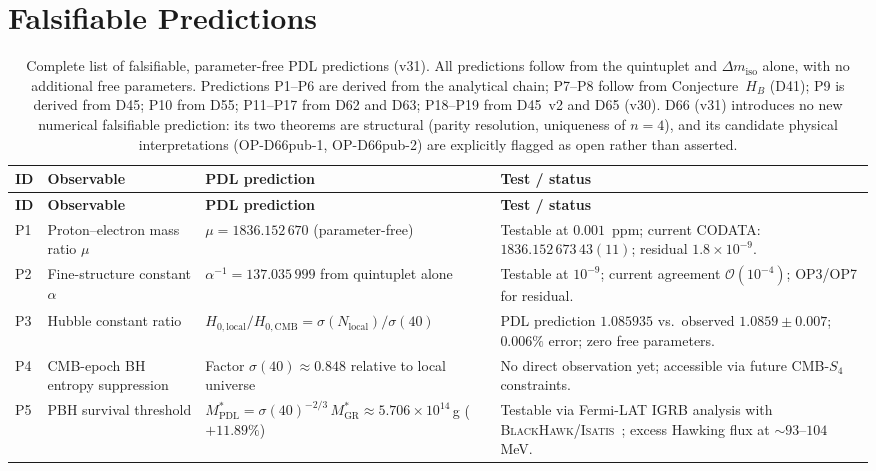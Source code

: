 \documentclass[11pt,a4paper]{article}
\theoremstyle{plain}
\theoremstyle{definition}
\theoremstyle{remark}
\begin{document}
\newpage

\section{Falsifiable Predictions}
\label{sec:predictions}

\begin{longtable}{L{0.5cm}L{3.2cm}L{5.2cm}L{4.2cm}}
\caption{Complete list of falsifiable, parameter-free PDL predictions (v31). All predictions follow from the quintuplet and $\Delta m_{\mathrm{iso}}$ alone, with no additional free parameters. Predictions P1--P6 are derived from the analytical chain; P7--P8 follow from Conjecture~$H_B$ (D41); P9 is derived from D45; P10 from D55; P11--P17 from D62 and D63; P18--P19 from D45~v2 and D65 (v30). D66 (v31) introduces no new numerical falsifiable prediction: its two theorems are structural (parity resolution, uniqueness of $n=4$), and its candidate physical interpretations (OP-D66pub-1, OP-D66pub-2) are explicitly flagged as open rather than asserted.}
\label{tab:predictions}\\
\toprule
\textbf{ID} & \textbf{Observable} & \textbf{PDL prediction} & \textbf{Test / status}\\
\midrule
\endfirsthead
\toprule
\textbf{ID} & \textbf{Observable} & \textbf{PDL prediction} & \textbf{Test / status}\\
\midrule
\endhead
\bottomrule
\endfoot
P1 & Proton--electron mass ratio $\mu$ & $\mu=1836.152\,670$ (parameter-free) & Testable at $0.001$~ppm; current CODATA: $1836.152\,673\,43(11)$; residual $1.8\times10^{-9}$.\\[0.4em]
P2 & Fine-structure constant $\alpha$ & $\alpha^{-1}=137.035\,999$ from quintuplet alone & Testable at $10^{-9}$; current agreement $\mathcal{O}(10^{-4})$; OP3/OP7 for residual.\\[0.4em]
P3 & Hubble constant ratio & $H_{0,\mathrm{local}}/H_{0,\mathrm{CMB}}=\sigma(N_{\mathrm{local}})/\sigma(40)$ & PDL prediction $1.085935$ vs.\ observed $1.0859\pm0.007$; $0.006\%$ error; zero free parameters.\\[0.4em]
P4 & CMB-epoch BH entropy suppression & Factor $\sigma(40)\approx 0.848$ relative to local universe & No direct observation yet; accessible via future CMB-$S_4$ constraints.\\[0.4em]
P5 & PBH survival threshold & $M^*_{\mathrm{PDL}}=\sigma(40)^{-2/3}\,M^*_{\mathrm{GR}}\approx 5.706\times10^{14}$\,g ($+11.89\%$) & Testable via Fermi-LAT IGRB analysis with \textsc{BlackHawk}/\textsc{Isatis}~\cite{D45}; excess Hawking flux at $\sim93$--$104$\,MeV.\\[0.4em]

\end{longtable}
\end{document}
